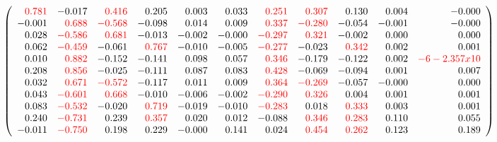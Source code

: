 \documentclass[]{article}
\begin{document}
\[
\left(
\begin{array}{rrrrrrrrrrr}
\color{red} 0.781 & -0.017 & \color{red} 0.416 & 0.205 & 0.003 & 0.033 & \color{red} 0.251 & \color{red} 0.307 & 0.130 & 0.004 & -0.000 \\
-0.001 & \color{red} 0.688 & \color{red} -0.568 & -0.098 & 0.014 & 0.009 & \color{red} 0.337 & \color{red} -0.280 & -0.054 & -0.001 & -0.000 \\
0.028 & \color{red} -0.586 & \color{red} 0.681 & -0.013 & -0.002 & -0.000 & \color{red} -0.297 & \color{red} 0.321 & -0.002 & 0.000 & 0.000 \\
0.062 & \color{red} -0.459 & -0.061 & \color{red} 0.767 & -0.010 & -0.005 & \color{red} -0.277 & -0.023 & \color{red} 0.342 & 0.002 & 0.001 \\
0.010 & \color{red} 0.882 & -0.152 & -0.141 & 0.098 & 0.057 & \color{red} 0.346 & -0.179 & -0.122 & 0.002 & \color{red}            -6
-2.357 x 10 \\
0.208 & \color{red} 0.856 & -0.025 & -0.111 & 0.087 & 0.083 & \color{red} 0.428 & -0.069 & -0.094 & 0.001 & 0.007 \\
0.032 & \color{red} 0.671 & \color{red} -0.572 & -0.117 & 0.011 & 0.009 & \color{red} 0.364 & \color{red} -0.269 & -0.057 & -0.000 & 0.000 \\
0.043 & \color{red} -0.601 & \color{red} 0.668 & -0.010 & -0.006 & -0.002 & \color{red} -0.290 & \color{red} 0.326 & 0.004 & 0.001 & 0.001 \\
0.083 & \color{red} -0.532 & -0.020 & \color{red} 0.719 & -0.019 & -0.010 & \color{red} -0.283 & 0.018 & \color{red} 0.333 & 0.003 & 0.001 \\
0.240 & \color{red} -0.731 & 0.239 & \color{red} 0.357 & 0.020 & 0.012 & -0.088 & \color{red} 0.346 & \color{red} 0.283 & 0.110 & 0.055 \\
-0.011 & \color{red} -0.750 & 0.198 & 0.229 & -0.000 & 0.141 & 0.024 & \color{red} 0.454 & \color{red} 0.262 & 0.123 & 0.189 \\
\end{array}
\right)
\]
\end{document}
